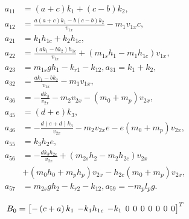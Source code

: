 \begin{align*}
a_{11} &= (a+c) k_1 + (c-b) k_2, \\
a_{12} &= \frac{a(a+c) k_1 - b(c-b) k_2}{v_{1x}} - m_1 v_{1x} c, \\
a_{21} &= k_1 h_{1c} + k_2 h_{1c}, \\
a_{22} &= \frac{(ak_1 - bk_2) h_{1c}}{v_{1x}} + (m_{1s} h_1 - m_1 h_{1c}) v_{1x}, \\
a_{23} &= m_{1s} gh_1 - k_{r1} - k_{12}, a_{31} = k_1 + k_2, \\
a_{32} &= \frac{ak_1 - bk_2}{v_{1x}} - m_1 v_{1x}, \\
a_{36} &= -\frac{dk_3}{v_{2x}} - m_2 v_{2x} - (m_0 + m_p) v_{2x}, \\
a_{45} &= (d+e) k_3, \\
a_{46} &= -\frac{d(e+d) k_3}{v_{2x}} - m_2 v_{2x} e - e(m_0 + m_p) v_{2x}, \\
a_{55} &= k_3 h_2 e, \\
a_{56} &= -\frac{dk_3 h_{2c}}{v_{2x}} + (m_{2s} h_2 - m_2 h_{2c}) v_{2x} \\
       &+ (m_0 h_0 + m_p h_p) v_{2x} - h_{2c}(m_0 + m_p) v_{2x}, \\
a_{57} &= m_{2s} gh_2 - k_{r2} - k_{12}, a_{59} = -m_p l_p g.\nonumber
\end{align*}


\vspace{-0.7cm}


\begin{equation}
\setlength{\arraycolsep}{2pt}
B_{0} = \begin{bmatrix}
{- \left( {c + a} \right)k_{1}} & {- k_{1}h_{1c}} & {- k_{1}} & 0 & 0 & 0 & 0 & 0 & 0 & 0\nonumber
\end{bmatrix}^{T}
\end{equation}

\vspace{-0.7cm}

































